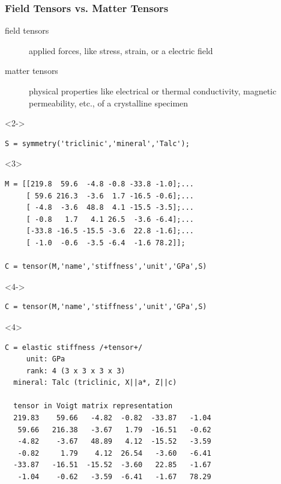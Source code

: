 \documentclass[compress]{beamer}
\begin{document}
\begin{frame}[fragile]
  \frametitle{Field Tensors vs. Matter Tensors}

  \begin{overlayarea}{\textwidth}{\textheight}

  \begin{description}
    \item[field tensors] applied forces, like stress, strain, or a electric
    field
    \item[matter tensors] physical properties like electrical or thermal
    conductivity, magnetic permeability, etc., of a crystalline specimen
  \end{description}

  \begin{onlyenv}<2->
    \begin{lstlisting}[style=input]
S = symmetry('triclinic','mineral','Talc');
\end{lstlisting}
\vspace{-0.3cm}
  \end{onlyenv}

\begin{onlyenv}<3>
  \begin{lstlisting}[style=input]
M = [[219.8  59.6  -4.8 -0.8 -33.8 -1.0];...
     [ 59.6 216.3  -3.6  1.7 -16.5 -0.6];...
     [ -4.8  -3.6  48.8  4.1 -15.5 -3.5];...
     [ -0.8   1.7   4.1 26.5  -3.6 -6.4];...
     [-33.8 -16.5 -15.5 -3.6  22.8 -1.6];...
     [ -1.0  -0.6  -3.5 -6.4  -1.6 78.2]];

C = tensor(M,'name','stiffness','unit','GPa',S)
  \end{lstlisting}
\end{onlyenv}
\begin{onlyenv}<4->
\begin{lstlisting}[style=input]
C = tensor(M,'name','stiffness','unit','GPa',S)
\end{lstlisting}
\vspace{-0.3cm}
\end{onlyenv}
\begin{onlyenv}<4>
\begin{lstlisting}[style=output]
C = elastic stiffness /+tensor+/
     unit: GPa
     rank: 4 (3 x 3 x 3 x 3)
  mineral: Talc (triclinic, X||a*, Z||c)

  tensor in Voigt matrix representation
  219.83    59.66   -4.82  -0.82  -33.87   -1.04
   59.66   216.38   -3.67   1.79  -16.51   -0.62
   -4.82    -3.67   48.89   4.12  -15.52   -3.59
   -0.82     1.79    4.12  26.54   -3.60   -6.41
  -33.87   -16.51  -15.52  -3.60   22.85   -1.67
   -1.04    -0.62   -3.59  -6.41   -1.67   78.29
\end{lstlisting}
\end{onlyenv}


\end{overlayarea}
\end{frame}
\end{document}
